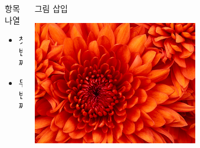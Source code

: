 \documentclass[9pt,blue,xcolor=pdftex,dvipsnames,table,handout,notes]{beamer}
\begin{document}
\begin{frame}[t]
		\begin{columns}[b]
		\begin{column}{.45\textwidth}

			\begin{block} {항목 나열}
			\begin{itemize}
			\item 첫 번째
			\item 두 번째
			\end{itemize}
			\end{block}

		\end{column}

		\begin{column}{.4\textwidth}

			\begin{block} {그림 삽입}
			\centerline{\includegraphics[scale=1.0,width=0.6\textwidth]{./fig/Chrysanthemum.jpg}}
			\end{block}

		\end{column}
		\end{columns}


		\end{frame}


\end{document}
